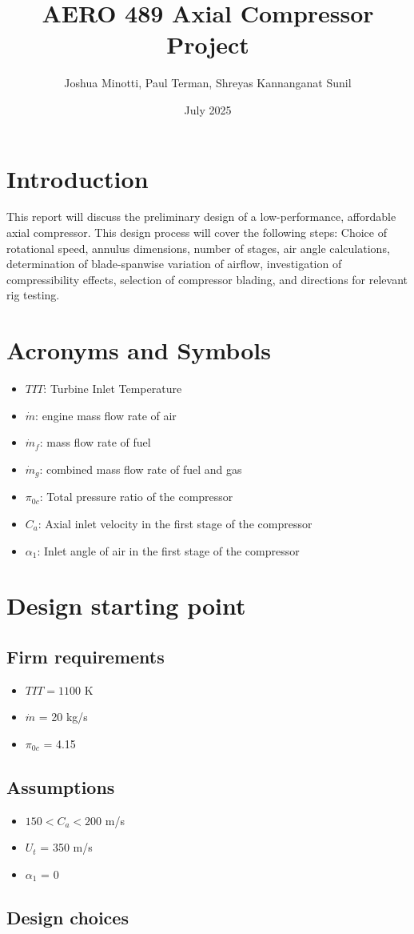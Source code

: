 \documentclass{article}
\title{AERO 489 Axial Compressor Project}
\author{Joshua Minotti, Paul Terman, Shreyas Kannanganat Sunil}
\date{July 2025}
\begin{document}
\maketitle

\section{Introduction}
This report will discuss the preliminary design of a low-performance, affordable axial compressor. This design process will cover the following steps:
Choice of rotational speed, annulus dimensions, number of stages, air angle calculations, determination of blade-spanwise variation of airflow, investigation 
of compressibility effects, selection of compressor blading, and directions for relevant rig testing.


\section{Acronyms and Symbols}
\begin{itemize}
  \item $TIT$: Turbine Inlet Temperature
  \item $\dot m$: engine mass flow rate of air
  \item $\dot m_{f}$: mass flow rate of fuel
  \item $\dot m_{g}$: combined mass flow rate of fuel and gas 
  \item $\pi_{0c}$: Total pressure ratio of the compressor
  \item $ C_a$: Axial inlet velocity in the first stage of the compressor
  \item $ \alpha_1$: Inlet angle of air in the first stage of the compressor
\end{itemize}

\section{Design starting point}

\subsection{Firm requirements}
\begin{itemize}
  \item $TIT=1100$ K
  \item $\dot m$ = 20 kg/s
  \item $\pi_{0c}$ = 4.15
\end{itemize}

\subsection{Assumptions}
\begin{itemize}
  \item $ 150 < C_a <200$ m/s 
  \item $U_t$ = 350 m/s 
  \item $\alpha_1$ = 0
\end{itemize}

\subsection{Design choices}
\end{document}
